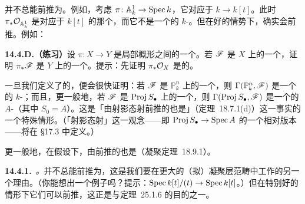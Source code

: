 \trCoherentSheaf{}并不总能前推为\trCoherentSheaf。例如，考虑\trStructureMorphism{} $\pi\colon\mathbb{A}^1_k\to\operatorname{Spec} k$，它对应于 $k\to k[t]$。此时 $\pi_*\mathcal{O}_{\mathbb{A}^1_k}$ 是对应于 $k[t]$ 的那个\trQCSheaf，而它不是一个\trFinitelyGenerated{}的 $k$-\trModule。但在好的情势下，\trCoherentSheaf{}确实会前推。例如：

\textbf{14.4.D.（练习）}\quad 设 $\pi\colon X\to Y$ 是局部\trNoetherian{}概形之间的一个\trFinite\trMorphism。若 $\mathscr{F}$ 是 $X$ 上的一个\trCoherentSheaf，证明 $\pi_*\mathscr{F}$ 是 $Y$ 上的一个\trCoherentSheaf。提示：先证明 $\pi_*\mathcal{O}_X$ 是\trFiniteType{}的。

一旦我们定义了\trQCSheaf{}的\trCohomology，便会很快证明：若 $\mathscr{F}$ 是 $\mathbb{P}^n_k$ 上的一个\trCoherentSheaf，则 $\Gamma(\mathbb{P}^n_k,\mathscr{F})$ 是一个\trFiniteDimensional{}的 $k$-\trModule；而且，更一般地，若 $\mathscr{F}$ 是 $\operatorname{Proj} S_\bullet$ 上的一个\trCoherentSheaf，则 $\Gamma(\operatorname{Proj} S_\bullet,\mathscr{F})$ 是一个\trCoh{}的 $A$-\trModule（其中 $S_0=A$）。这是「由射影态射前推的\trCoherentSheaf{}也是\trCoherentSheaf」（定理~18.7.1(d)）这一事实的一个特殊情形。（「射影态射」这一观念——即 $\operatorname{Proj} S_\bullet\to\operatorname{Spec} A$ 的一个相对版本——将在 \S17.3 中定义。）

更一般地，在\trNoetherian{}假设下，由\trProper\trMorphism{}前推的\trCoherentSheaf{}也是\trCoherentSheaf（\trGrothendieck{}凝聚定理~18.9.1）。

\textbf{14.4.1.}\ \emph{\trhRemark{}。}\quad \trVectorBundle{}并不总能前推为\trVectorBundle，这是我们要在更大的（拟）凝聚层范畴中工作的另一个理由。（你能想出一个例子吗？提示：$\operatorname{Spec} k[t]/(t)\to\operatorname{Spec} k[t]$。）但在特别好的情形下它们可以前推，这正是\trCohomology{}与\trBaseChange{}定理~25.1.6 的目的之一。
